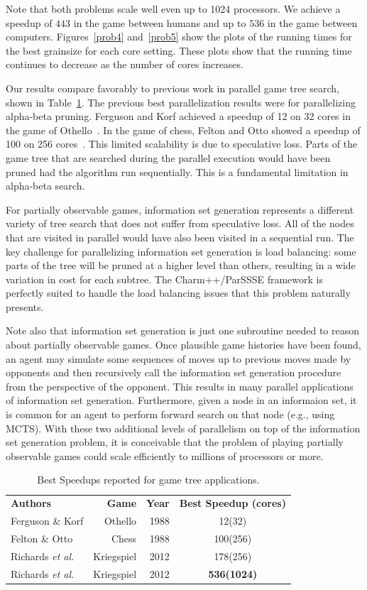 \documentclass[times, 10pt,twocolumn]{article}
\newcommand{\etal}{{\em et al.}\ }
\begin{document}
Note that both problems scale well even up to 1024 processors.  We achieve a speedup of $443$ in the game between humans and up to $536$ in the game between computers.  Figures~\ref{prob4} and~\ref{prob5} show the plots of the running times for the best grainsize for each core setting.  These plots show that the running time continues to decrease as the number of cores increases.

Our results compare favorably to previous work in parallel game tree search, shown in Table~\ref{bestspeedups}.  The previous best parallelization results were for parallelizing alpha-beta pruning.  Ferguson and Korf achieved a speedup of 12 on 32 cores in the game of Othello~\cite{ferguson88distributed}.  In the game of chess, Felton and Otto showed a speedup of 100 on 256 cores~\cite{felten88highly}.  This limited scalability is due to speculative loss.  Parts of the game tree that are searched during the parallel execution would have been pruned had the algorithm run sequentially.  This is a fundamental limitation in alpha-beta search. 

For partially observable games, information set generation represents a different variety of tree search that does not suffer from speculative loss.  All of the nodes that are visited in parallel would have also been visited in a sequential run.  The key challenge for parallelizing information set generation is load balancing: some parts of the tree will be pruned at a higher level than others, resulting in a wide variation in cost for each subtree.  The {\sc Charm++/ParSSSE} framework is perfectly suited to handle the load balancing issues that this problem naturally presents.

Note also that information set generation is just one subroutine needed to reason about partially observable games.  Once plausible game histories have been found, an agent may simulate some sequences of moves up to previous moves made by opponents and then recursively call the information set generation procedure from the perspective of the opponent.  This results in many parallel applications of information set generation. Furthermore, given a node in an informaion set, it is common for an agent to perform forward search on that node (e.g., using MCTS).  With these two additional levels of parallelism on top of the information set generation problem, it is conceivable that the problem of playing partially observable games could scale efficiently to millions of processors or more.
\begin{table}[tphb]
\centering
\begin{tabular}{lrrc}
{\bf Authors} & {\bf Game} & {\bf Year} & {\bf Best Speedup (cores)} \\
Ferguson \& Korf & Othello & 1988 & 12(32) \\
Felton \& Otto & Chess & 1988 & 100(256) \\
Richards \etal & Kriegspiel & 2012 & 178(256) \\
Richards \etal & Kriegspiel & 2012 & {\bf 536(1024)} \\
\end{tabular}
\caption{Best Speedups reported for game tree applications.}
\label{bestspeedups}
\end{table}
\end{document}
